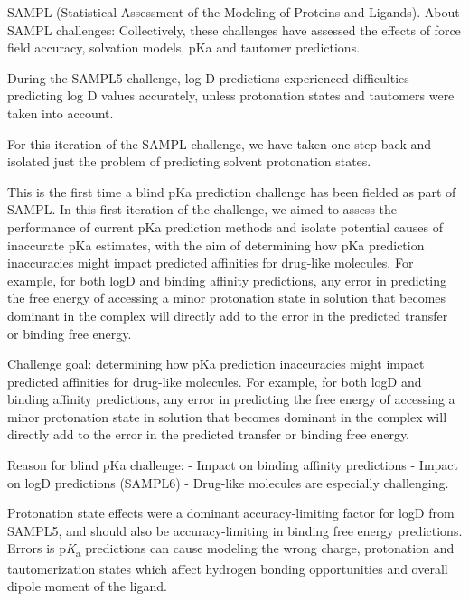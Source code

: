 \documentclass[9pt,lineno,final]{elife}
\newcommand{\pKa}{p\textit{K}\textsubscript{a}}
\begin{document}

SAMPL (Statistical Assessment of the Modeling of Proteins and Ligands). About SAMPL challenges: Collectively, these challenges have assessed the effects of force field accuracy, solvation models, pKa and tautomer predictions.  

During the SAMPL5 challenge, log D predictions experienced difficulties predicting log D values accurately, unless protonation states and tautomers were taken into account.

For this iteration of the SAMPL challenge, we have taken one step back and isolated just the problem of predicting solvent protonation states.

This is the first time a blind pKa prediction challenge has been fielded as part of SAMPL. 
In this first iteration of the challenge, we aimed to assess the performance of current pKa prediction methods and isolate potential causes of inaccurate pKa estimates, with the aim of determining how pKa prediction inaccuracies might impact predicted affinities for drug-like molecules. 
For example, for both logD and binding affinity predictions, any error in predicting the free energy of accessing a minor protonation state in solution that becomes dominant in the complex will directly add to the error in the predicted transfer or binding free energy. 

Challenge goal: determining how pKa prediction inaccuracies might impact predicted affinities for drug-like molecules. For example, for both logD and binding affinity predictions, any error in predicting the free energy of accessing a minor protonation state in solution that becomes dominant in the complex will directly add to the error in the predicted transfer or binding free energy. 

Reason for blind pKa challenge:
- Impact on binding affinity predictions
- Impact on logD predictions (SAMPL6)
- Drug-like molecules are especially challenging.

Protonation state effects were a dominant accuracy-limiting factor for logD from SAMPL5, and should also be accuracy-limiting in binding free energy predictions.
Errors is \pKa{} predictions can cause modeling the wrong charge, protonation and tautomerization states which affect hydrogen bonding opportunities and overall dipole moment of the ligand.
\end{document}
